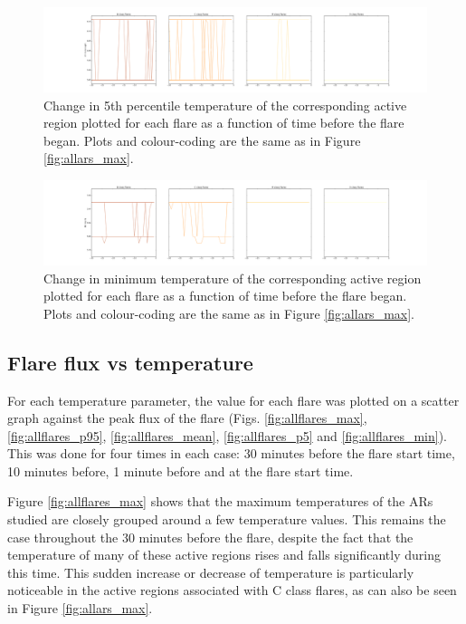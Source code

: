 \documentclass[referee,a4paper,12pt]{swsc}
\begin{document}
\begin{linenumbers}
\begin{figure}
	\centering
		\includegraphics[width=\columnwidth]{tempplots_p5/allars.png}
	\caption{Change in 5th percentile temperature of the corresponding active region plotted for each flare as a function of time before the flare began. Plots and colour-coding are the same as in Figure \ref{fig:allars_max}.}
	\label{fig:allars_p5}
\end{figure}
\begin{figure}
	\centering
		\includegraphics[width=\columnwidth]{tempplots_min/allars.png}
	\caption{Change in minimum temperature of the corresponding active region plotted for each flare as a function of time before the flare began. Plots and colour-coding are the same as in Figure \ref{fig:allars_max}.}
	\label{fig:allars_min}
\end{figure}

\subsection{Flare flux vs temperature}
For each temperature parameter, the value for each flare was plotted on a scatter graph against the peak flux of the flare (Figs. \ref{fig:allflares_max}, \ref{fig:allflares_p95}, \ref{fig:allflares_mean}, \ref{fig:allflares_p5} and \ref{fig:allflares_min}).
This was done for four times in each case: 30 minutes before the flare start time, 10 minutes before, 1 minute before and at the flare start time.

Figure \ref{fig:allflares_max} shows that the maximum temperatures of the ARs studied are closely grouped around a few temperature values.
This remains the case throughout the 30 minutes before the flare, despite the fact that the temperature of many of these active regions rises and falls significantly during this time.
This sudden increase or decrease of temperature is particularly noticeable in the active regions associated with C class flares, as can also be seen in Figure \ref{fig:allars_max}.


\end{linenumbers}
\end{document}
